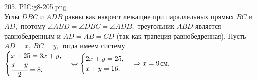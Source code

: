 205. {{PIC:g8-205.png}}\\
Углы $DBC$ и $ADB$ равны как накрест лежащие при параллельных прямых $BC$ и $AD,$ поэтому $\angle ABD=\angle DBC=\angle ADB,$ треугольник $ABD$ является равнобедренным и $AD=AB=CD$ (так как трапеция равнобедренная). Пусть $AD=x,\ BC=y,$ тогда имеем систему\\ $\begin{cases} x+25=3x+y,\\ \cfrac{x+y}{2}=8. \end{cases}
\Leftrightarrow  \begin{cases} 2x+y=25,\\ x+y=16. \end{cases} \Rightarrow x=9$см.\\
